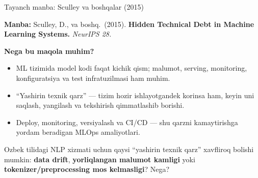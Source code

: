 \documentclass[aspectratio=169,11pt]{beamer}
\newcommand{\uzq}{\textquotesingle{}}   %
\begin{document}
\begin{frame}{Tayanch manba: Sculley va boshqalar (2015)}
  \small

  \begin{tcolorbox}[defbox,top=2pt,bottom=2pt,left=4pt,right=4pt]
    \footnotesize
    \textbf{Manba:}
    Sculley, D., va boshq.\ (2015).
    \textbf{Hidden Technical Debt in Machine Learning Systems.}
    \textit{NeurIPS 28.}
  \end{tcolorbox}

  \vspace{4pt}

  \textbf{Nega bu maqola muhim?}
  \begin{itemize}\setlength\itemsep{3pt}
    \item ML tizimida model kodi faqat kichik qism; ma\uzq{}lumot, serving,
          monitoring, konfiguratsiya va test infratuzilmasi ham muhim.
    \item ``Yashirin texnik qarz'' --- tizim hozir ishlayotgandek ko\uzq{}rinsa ham,
          keyin uni saqlash, yangilash va tekshirish qimmatlashib borishi.
    \item Deploy, monitoring, versiyalash va CI/CD --- shu qarzni kamaytirishga
          yordam beradigan MLOps amaliyotlari.
  \end{itemize}

  \vspace{4pt}

  \begin{tcolorbox}[warnbox,title={Muhokama savoli},top=2pt,bottom=2pt,left=4pt,right=4pt]
    \footnotesize
    O\uzq{}zbek tilidagi NLP xizmati uchun qaysi ``yashirin texnik qarz''
    xavfliroq bo\uzq{}lishi mumkin:
    \textbf{data drift}, \textbf{yorliqlangan ma\uzq{}lumot kamligi} yoki
    \textbf{tokenizer/preprocessing mos kelmasligi}? Nega?
  \end{tcolorbox}
\end{frame}
\end{document}
